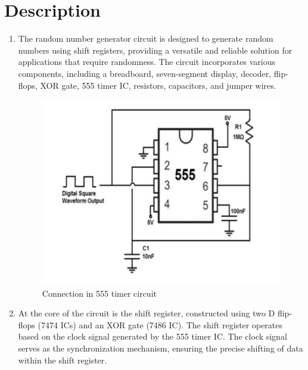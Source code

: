 \documentclass[journal,12pt,twocolumn]{IEEEtran}
\begin{document}
\section{Description}
\begin{enumerate}
	\item The random number generator circuit is designed to generate random numbers using shift registers, providing a versatile and reliable solution for applications that require randomness. The circuit incorporates various components, including a breadboard, seven-segment display, decoder, flip-flops, XOR gate, 555 timer IC, resistors, capacitors, and jumper wires.
	\begin{figure}[h]
		\includegraphics[width=\linewidth]{images/fig07.jpg}
		\caption{Connection in 555 timer circuit}
		\label{555_t_c}
	\end{figure}
	
	\item At the core of the circuit is the shift register, constructed using two D flip-flops (7474 ICs) and an XOR gate (7486 IC). The shift register operates based on the clock signal generated by the 555 timer IC. The clock signal serves as the synchronization mechanism, ensuring the precise shifting of data within the shift register.
	

\end{enumerate}
\end{document}
